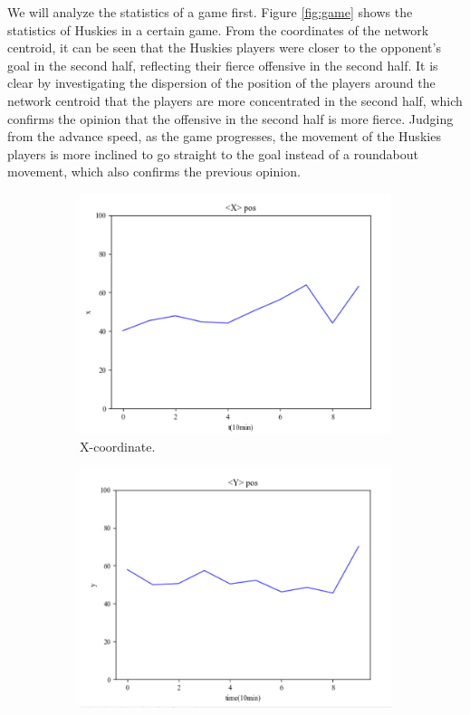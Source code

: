 \documentclass{mcmthesis}
\begin{document}
	We will analyze the statistics of a game first. Figure \ref{fig:game} shows the statistics of Huskies in a certain game.  From the coordinates of the network centroid, it can be seen that the Huskies players were closer to the opponent's goal in the second half, reflecting their fierce offensive in the second half.  It is clear by investigating the dispersion of the position of the players around the network centroid that the players are more concentrated in the second half, which confirms the opinion that the offensive in the second half is more fierce.  Judging from the advance speed, as the game progresses, the movement of the Huskies players is more inclined to go straight to the goal instead of a roundabout movement, which also confirms the previous opinion.
	\begin{figure}[h]
		\centering
		\begin{subfigure}[b]{0.24\textwidth}
			\includegraphics[width=\textwidth]{figures/xc1.png}
			\caption{X-coordinate.}
			\label{fig:x1}
		\end{subfigure}
		\begin{subfigure}[b]{0.24\textwidth}
			\includegraphics[width=\textwidth]{figures/yc1.png}

\end{subfigure}
\end{figure}
\end{document}
